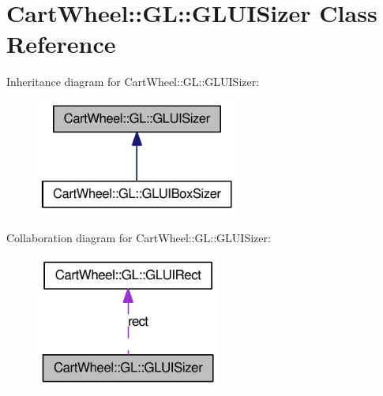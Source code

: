 \hypertarget{classCartWheel_1_1GL_1_1GLUISizer}{
\section{CartWheel::GL::GLUISizer Class Reference}
\label{classCartWheel_1_1GL_1_1GLUISizer}
}


Inheritance diagram for CartWheel::GL::GLUISizer:\nopagebreak
\begin{figure}[H]
\begin{center}
\leavevmode
\includegraphics[width=188pt]{classCartWheel_1_1GL_1_1GLUISizer__inherit__graph}
\end{center}
\end{figure}


Collaboration diagram for CartWheel::GL::GLUISizer:\nopagebreak
\begin{figure}[H]
\begin{center}
\leavevmode
\includegraphics[width=172pt]{classCartWheel_1_1GL_1_1GLUISizer__coll__graph}
\end{center}
\end{figure}
